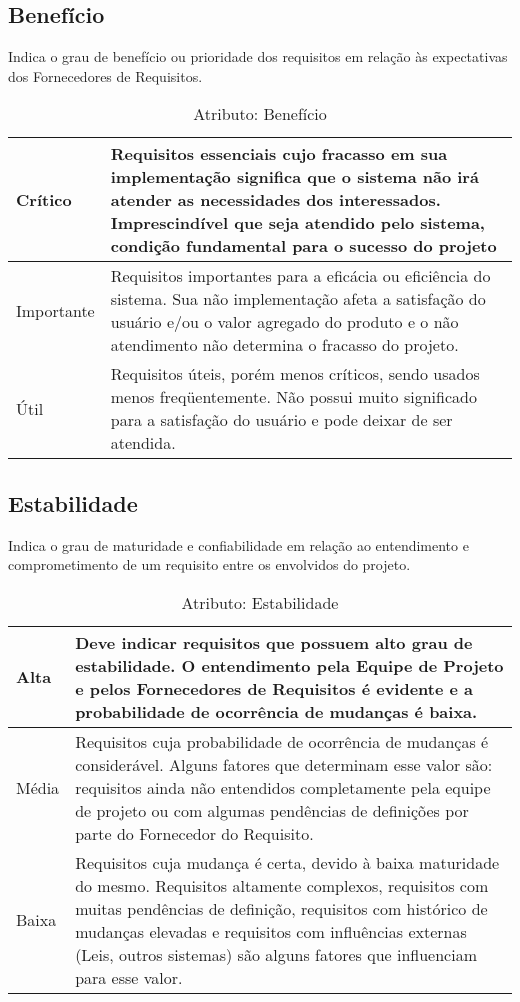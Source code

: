 \subsection{Benefício}
  Indica o grau de benefício ou prioridade dos requisitos em relação às
expectativas dos Fornecedores de Requisitos.

\begin{table}[H]
  \centering
    \begin{tabular}{| m{5em} | m{10cm} |}
      \hline
      Crítico     & Requisitos essenciais cujo fracasso em sua implementação significa que o sistema não irá atender as necessidades dos interessados. Imprescindível que seja atendido pelo sistema, condição fundamental para o sucesso do projeto   \\ \hline
      Importante & Requisitos importantes para a eficácia ou eficiência do sistema. Sua não implementação afeta a satisfação do usuário e/ou o valor agregado do produto e o não atendimento não determina o fracasso do projeto. \\ \hline
      Útil & Requisitos úteis, porém menos críticos, sendo usados menos freqüentemente. Não possui muito significado para a satisfação do usuário e pode deixar de ser atendida.   \\ \hline
    \end{tabular}
    \caption{Atributo: Benefício }
    \label{tabela:atributo_beneficio}
\end{table}

\subsection{Estabilidade}
  Indica o grau de maturidade e confiabilidade em relação ao entendimento e
comprometimento de um requisito entre os envolvidos do projeto.

\begin{table}[H]
  \centering
    \begin{tabular}{| m{5em} | m{10cm} |}
      \hline
      Alta     & Deve indicar requisitos que possuem alto grau de estabilidade. O entendimento pela Equipe de Projeto e pelos Fornecedores de Requisitos é evidente e a probabilidade de ocorrência de mudanças é baixa.   \\ \hline
      Média & Requisitos cuja   probabilidade de ocorrência de mudanças é considerável. Alguns fatores que determinam esse valor são: requisitos ainda não entendidos completamente pela equipe de projeto ou com algumas pendências de definições por parte do Fornecedor do Requisito. \\ \hline
      Baixa & Requisitos cuja mudança é certa, devido à baixa maturidade do mesmo. Requisitos altamente complexos, requisitos com muitas pendências de definição, requisitos com   histórico de mudanças elevadas e requisitos com influências externas (Leis, outros sistemas) são alguns fatores que influenciam para esse valor.   \\ \hline
    \end{tabular}
    \caption{Atributo: Estabilidade }
    \label{tabela:atributo_estabilidade}
\end{table}

